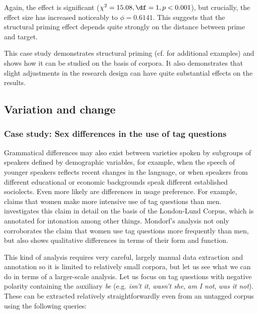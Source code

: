 Again, the effect is significant ($\chi^2 = 15.08, \df=1, p < 0.001$),  but crucially, the effect size  has increased noticeably to $\phi = 0.6141$. This suggests that the structural priming  effect depends quite strongly on the distance between prime and target.

This case study demonstrates structural priming  (cf. \citet{szmrecsanyi_language_2005} for additional examples) and shows how it can be studied on the basis of corpora. It also demonstrates that slight adjustments in the research design  can have quite substantial effects on the results.

\subsection{Variation and change}
\label{sec:variationandchange}

\subsubsection{Case study: Sex differences in the use of tag questions}
\label{sec:sexdifferencesintheuseoftagquestions}

Grammatical  differences may also exist between varieties  spoken by subgroups of speakers defined by demographic  variables, for example, when the speech of younger speakers reflects recent changes in the language, or when speakers from different educational or economic backgrounds speak different established sociolects. Even more likely are differences in usage preference. For example, \citet{lakoff_language_1973} claims that women make more intensive use of tag questions  than men.  \citet{mondorf_syntactic_2004} investigates this claim in detail on the basis of the London\hyp{}Lund Corpus, which is annotated  for intonation  among other things. Mondorf's analysis not only corroborates the claim that women use tag questions more frequently than men, but also shows qualitative  differences in terms of their form and function.

This kind of analysis requires very careful, largely manual  data extraction  and annotation  so it is limited to relatively small corpora, but let us see what we can do in terms of a larger\hyp{}scale analysis. Let us focus on tag questions  with negative  polarity containing the auxiliary \textit{be} (e.g. \textit{isn't it}, \textit{wasn't she}, \textit{am I not}, \textit{was it not}). These can be extracted  relatively straightforwardly even from an untagged  corpus using the following queries:

